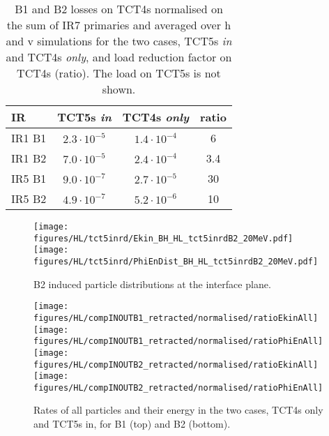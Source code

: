 \begin{table}%
   \centering
   \caption{B1 and B2 losses on TCT4s  normalised on the sum of IR7 primaries and averaged over h and v simulations for the two cases, TCT5s \textit{in} and TCT4s \textit{only}, and load reduction factor on TCT4s (ratio). The load on TCT5s is not shown.} 
   \begin{tabular}{l|c|c|c}
       \hline
       IR & TCT5s \textit{in} &  TCT4s \textit{only} & ratio \\
       \hline\hline
       IR1 B1 & $2.3 \cdot 10^{-5}$ & $1.4 \cdot 10^{-4}$ & 6\\
       IR1 B2 & $7.0 \cdot 10^{-5}$ & $2.4 \cdot 10^{-4}$ & 3.4 \\ 
       IR5 B1 & $9.0 \cdot 10^{-7}$ & $2.7 \cdot 10^{-5}$ & 30\\
       IR5 B2 & $4.9 \cdot 10^{-7}$ & $5.2 \cdot 10^{-6}$ & 10\\

       \hline
   \end{tabular}
   \label{tab:compLosses}
\end{table}




\begin{figure}
\begin{center}
\texttt{[image: figures/HL/tct5inrd/Ekin\_BH\_HL\_tct5inrdB2\_20MeV.pdf]}
\texttt{[image: figures/HL/tct5inrd/PhiEnDist\_BH\_HL\_tct5inrdB2\_20MeV.pdf]}
\end{center}
\vspace{-0.6cm}
 \caption{B2 induced particle distributions at the interface plane.}
  \label{tct5inrdb2retr}
\end{figure}



\begin{figure}
\centering
\texttt{[image: figures/HL/compINOUTB1\_retracted/normalised/ratioEkinAll]}
\texttt{[image: figures/HL/compINOUTB1\_retracted/normalised/ratioPhiEnAll]}
\texttt{[image: figures/HL/compINOUTB2\_retracted/normalised/ratioEkinAll]}
\texttt{[image: figures/HL/compINOUTB2\_retracted/normalised/ratioPhiEnAll]}
\caption{Rates of all particles and their energy in the two cases, TCT4s only and TCT5s in, for B1 (top) and B2 (bottom). 
  \label{fig:compInOutB1}}
\end{figure}

